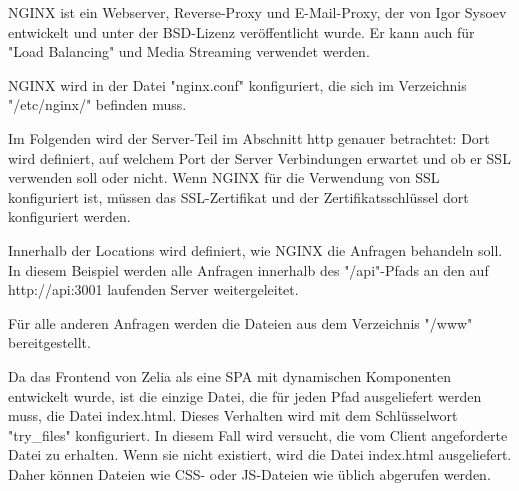 

NGINX ist ein Webserver, Reverse-Proxy und E-Mail-Proxy, der von Igor Sysoev entwickelt und unter der BSD-Lizenz veröffentlicht wurde. Er kann auch für "Load Balancing" und Media Streaming verwendet werden.

\cite{WikiNginx}
\cite{nginx}

NGINX wird in der Datei "nginx.conf" konfiguriert, die sich im Verzeichnis "/etc/nginx/" befinden muss. 


Im Folgenden wird der Server-Teil im Abschnitt http genauer betrachtet:
Dort wird definiert, auf welchem Port der Server Verbindungen erwartet und ob er SSL verwenden soll oder nicht. Wenn NGINX für die Verwendung von SSL konfiguriert ist, müssen das SSL-Zertifikat und der Zertifikatsschlüssel dort konfiguriert werden.

Innerhalb der Locations wird definiert, wie NGINX die Anfragen behandeln soll.\\ In diesem Beispiel werden alle Anfragen innerhalb des "/api"-Pfads an den auf\\ http://api:3001 laufenden Server weitergeleitet.

Für alle anderen Anfragen werden die Dateien aus dem Verzeichnis "/www" bereitgestellt. 

Da das Frontend von Zelia als eine SPA mit dynamischen Komponenten entwickelt wurde, ist die einzige Datei, die für jeden Pfad ausgeliefert werden muss, die Datei index.html. Dieses Verhalten wird mit dem Schlüsselwort "try\_files" konfiguriert. In diesem Fall wird versucht, die vom Client angeforderte Datei zu erhalten. Wenn sie nicht existiert, wird die Datei index.html ausgeliefert. Daher können Dateien wie CSS- oder JS-Dateien wie üblich abgerufen werden.

